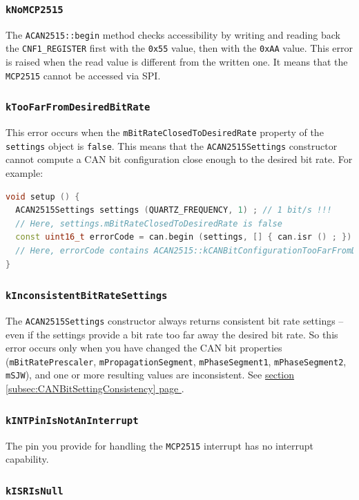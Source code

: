 \documentclass[10pt, a4paper, obeyspaces]{extarticle}
\newcommand\refSubsectionPage[1]{\hyperref[subsec:#1]{section \ref*{subsec:#1} page \pageref{subsec:#1}}}
\newcommand \subsubsectionLabel[2]{\subsubsection{#1}\label{subsubsec:#2}}
\begin{document}
\subsubsectionLabel{\texttt{kNoMCP2515}}{kNoMCP2515}

The \texttt{ACAN2515::begin} method checks accessibility by writing and reading back the \texttt{CNF1\_REGISTER} first with the \texttt{0x55} value, then with the \texttt{0xAA} value. This error is raised when the read value is different from the written one. It means that the \texttt{MCP2515} cannot be accessed via SPI. 

\subsubsectionLabel{\texttt{kTooFarFromDesiredBitRate}}{kTooFarFromDesiredBitRate}

This error occurs when the \texttt{mBitRateClosedToDesiredRate} property of the \texttt{settings} object is \texttt{false}. This means that the \texttt{ACAN2515Settings} constructor cannot compute a CAN bit configuration close enough to the desired bit rate. For example:

{ \small\begin{lstlisting}[language=c++]
void setup () {
  ACAN2515Settings settings (QUARTZ_FREQUENCY, 1) ; // 1 bit/s !!!
  // Here, settings.mBitRateClosedToDesiredRate is false
  const uint16_t errorCode = can.begin (settings, [] { can.isr () ; }) ;
  // Here, errorCode contains ACAN2515::kCANBitConfigurationTooFarFromDesiredBitRate
}
\end{lstlisting}}




\subsubsectionLabel{\texttt{kInconsistentBitRateSettings}}{kInconsistentBitRateSettings}

The \texttt{ACAN2515Settings} constructor always returns consistent bit rate settings -- even if the settings provide a bit rate too far away the desired bit rate. So this error occurs only when you have changed the CAN bit properties (\texttt{mBitRatePrescaler}, \texttt{mPropagationSegment}, \texttt{mPhaseSegment1}, \texttt{mPhaseSegment2}, \texttt{mSJW}), and one or more resulting values are inconsistent. See \refSubsectionPage{CANBitSettingConsistency}.











\subsubsectionLabel{\texttt{kINTPinIsNotAnInterrupt}}{kINTPinIsNotAnInterrupt}

The pin you provide for handling the \texttt{MCP2515} interrupt has no interrupt capability.

\subsubsectionLabel{\texttt{kISRIsNull}}{kISRIsNull}
\end{document}
